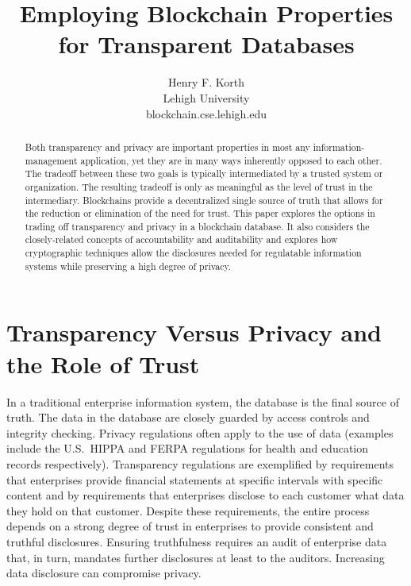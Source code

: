 \documentclass[11pt,dvipdfm]{article}
\begin{document}
 
\title{Employing Blockchain Properties for Transparent Databases}
\author {Henry F. Korth\\ Lehigh University\\ blockchain.cse.lehigh.edu}
\maketitle
 \begin{abstract}
 Both transparency and privacy are important properties in most any
information-management application, yet they are in many ways inherently opposed to
each other.
The tradeoff between these two goals is typically intermediated by a trusted system or
organization.  The resulting tradeoff is  only as meaningful as the level of trust in the
intermediary.  
Blockchains provide a decentralized single source of truth that allows for the reduction or
elimination of the need for trust.
This paper explores the options in trading off transparency and privacy in a 
blockchain database.  
It also considers the closely-related concepts of accountability and auditability and explores
how cryptographic techniques  allow the disclosures needed for 
regulatable information systems while preserving
a high degree of privacy.

\end{abstract}
 
\section{Transparency Versus Privacy and the Role of Trust}
\label{hfk:hiding}
In a traditional enterprise information system, the database is the final source of truth.
The data in the database are closely guarded by access controls and 
integrity checking.
Privacy regulations often apply to the use of data (examples include the U.S.\
HIPPA and FERPA regulations for health and education records respectively).
Transparency regulations are exemplified by requirements that enterprises  provide financial statements
at specific intervals with specific content and by requirements that enterprises  disclose to each customer
what data they hold on that customer.
Despite these requirements, the entire process depends on a strong degree of trust in enterprises to
provide consistent and truthful disclosures.
Ensuring truthfulness requires an audit of enterprise data that, in turn, mandates further
disclosures at least to the auditors.
Increasing data disclosure can compromise privacy.
\end{document}

